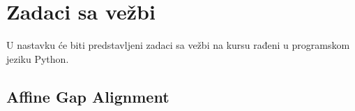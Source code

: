 \newpage

\section{Zadaci sa vežbi}
\setexamplecodestyle

U nastavku će biti predstavljeni zadaci sa vežbi na kursu rađeni u programskom jeziku Python.

\subsection{Affine Gap Alignment}




